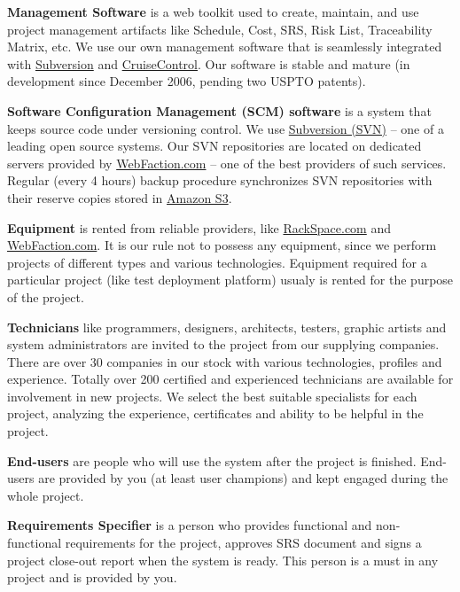 \textbf{Management Software} is a web toolkit used to create, maintain, and use project management artifacts
like Schedule, Cost, SRS, Risk List, Traceability Matrix, etc. We use our own management software
that is seamlessly integrated with \href{http://subversion.tigris.org}{Subversion}
and \href{http://www.cruisecontrol.net/}{CruiseControl}.
Our software is stable and mature (in development since December 2006, pending two USPTO patents).

\textbf{Software Configuration Management (SCM) software} is a system that keeps source code 
under versioning control. We use \href{http://subversion.tigris.org/}{Subversion (SVN)}
-- one of a leading open source systems. Our SVN
repositories are located on dedicated servers provided by
\href{http://www.webfaction.com}{WebFaction.com} -- one of the best
providers of such services. Regular (every 4 hours) backup procedure
synchronizes SVN repositories with
their reserve copies stored in \href{http://aws.amazon.com/s3/}{Amazon S3}.

\textbf{Equipment} is rented from reliable providers, like
\href{http://www.rackspace.com}{RackSpace.com} and 
\href{http://www.webfaction.com}{WebFaction.com}.
It is our rule not to possess any equipment, since we perform projects of different types and various technologies.
Equipment required for a particular project (like test deployment platform) usualy is rented for the
purpose of the project.

\textbf{Technicians} like programmers, designers, architects, testers, graphic artists and system administrators
are invited to the project from our supplying companies. There are over 30 companies in our
stock with various technologies, profiles and experience. 
Totally over 200 certified and experienced technicians are available for involvement in new projects.
We select the best suitable specialists
for each project, analyzing the experience, certificates and ability to be helpful in the project.

\textbf{End-users} are people who will use the system after the project is finished.
End-users are provided by you (at least user champions) and kept engaged during the whole project.

\textbf{Requirements Specifier} is a person who provides functional and non-functional requirements
for the project, approves SRS document and signs a project close-out report when the system is ready.
This person is a must in any project and is provided by you.
